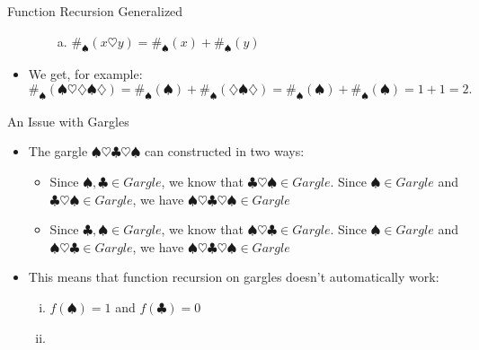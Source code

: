 \documentclass[../slides.tex]{subfiles}
\begin{document}
\begin{frame}{Function Recursion Generalized}
\begin{itemize}
\begin{enumerate}[(i)]
\begin{enumerate}[(a)]
					\item $\#_\spadesuit(x\heartsuit y)=\#_\spadesuit(x)+\#_\spadesuit(y)$		
		\end{enumerate}
		
	\end{enumerate}
	
	\item We get, for example:{\small\[\#_\spadesuit(\spadesuit\heartsuit\diamondsuit\spadesuit\diamondsuit)=\#_\spadesuit(\spadesuit)+\#_\spadesuit(\diamondsuit\spadesuit\diamondsuit)=\#_\spadesuit(\spadesuit)+\#_\spadesuit(\spadesuit)=1+1=2.\]}
	
	\end{itemize}

\end{frame}

\begin{frame}{An Issue with Gargles}

	\begin{itemize}
	
		\item The gargle $\spadesuit\heartsuit\clubsuit\heartsuit\spadesuit$ can constructed in two ways: 
		\begin{itemize}
		
			\item Since $\spadesuit,\clubsuit\in Gargle$, we know that $\clubsuit\heartsuit\spadesuit\in Gargle$. Since $\spadesuit\in Gargle$ and $\clubsuit\heartsuit\spadesuit\in Gargle$, we have $\spadesuit\heartsuit\clubsuit\heartsuit\spadesuit\in Gargle$
		
			\item Since $\clubsuit,\spadesuit\in Gargle$, we know that $\spadesuit\heartsuit\clubsuit\in Gargle$. Since $\spadesuit\in Gargle$ and $\spadesuit\heartsuit\clubsuit\in Gargle$, we have $\spadesuit\heartsuit\clubsuit\heartsuit\spadesuit\in Gargle$
		
		\end{itemize}
		
		\item This means that function recursion on gargles doesn't automatically work:
		
		\begin{enumerate}[(i)]
		
			\item $f(\spadesuit)=1$ and $f(\clubsuit)=0$
			
			\item \begin{enumerate}[(a)]
			

\end{enumerate}
\end{enumerate}
\end{itemize}
\end{frame}
\end{document}
